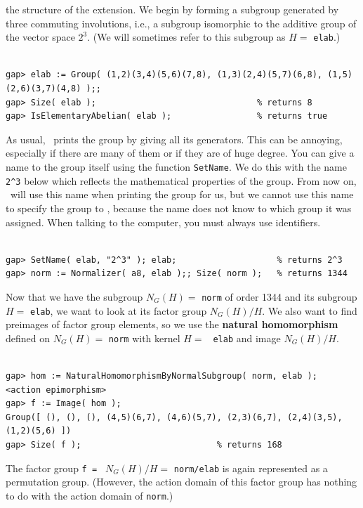the structure of the extension. We begin by forming a subgroup generated by three commuting involutions,
i.e., a subgroup isomorphic to the additive group of the vector space $2^3$.
(We will sometimes refer to this subgroup as $H= $ {\tt elab}.)  
{\codesize
\begin{verbatim}

gap> elab := Group( (1,2)(3,4)(5,6)(7,8), (1,3)(2,4)(5,7)(6,8), (1,5)(2,6)(3,7)(4,8) );;
gap> Size( elab );                                % returns 8
gap> IsElementaryAbelian( elab );                 % returns true

\end{verbatim}}
\noindent As usual, \gap\ prints the group by giving all its generators. This can be annoying, especially if there are
many of them or if they are of huge degree.  You can give a name to the group itself using
the function {\tt SetName}. 
We do this with the name \verb.2^3. below which reflects the mathematical properties of the
group. From now on, \gap\ will use this name when printing the group for us, but we cannot use this
name to specify the group to \gap, because the name does not know to which group it
was assigned.  When talking to the computer, you must always use identifiers.
{\codesize
\begin{verbatim}

gap> SetName( elab, "2^3" ); elab;                    % returns 2^3
gap> norm := Normalizer( a8, elab );; Size( norm );   % returns 1344

\end{verbatim}}
\noindent Now that we have the subgroup $N_G(H)= $ {\tt norm} of order 1344 and its subgroup $H=
$ {\tt elab}, we want to look at its factor
group $N_G(H)/H$. We also want to find preimages of factor group elements, so we use
the {\bf natural homomorphism} defined on $N_G(H)= $ {\tt norm} with kernel $H= $ {\tt
  elab} and image $N_G(H)/H$.
{\codesize
\begin{verbatim}

gap> hom := NaturalHomomorphismByNormalSubgroup( norm, elab );
<action epimorphism>
gap> f := Image( hom );
Group([ (), (), (), (4,5)(6,7), (4,6)(5,7), (2,3)(6,7), (2,4)(3,5),(1,2)(5,6) ])
gap> Size( f );                           % returns 168

\end{verbatim}}
\noindent The factor group {\tt f = } $ N_G(H)/H = $ {\tt norm/elab} is again represented as a permutation
group. 
(However, the action domain of this factor group has nothing to do with the action
domain of {\tt norm}.)
